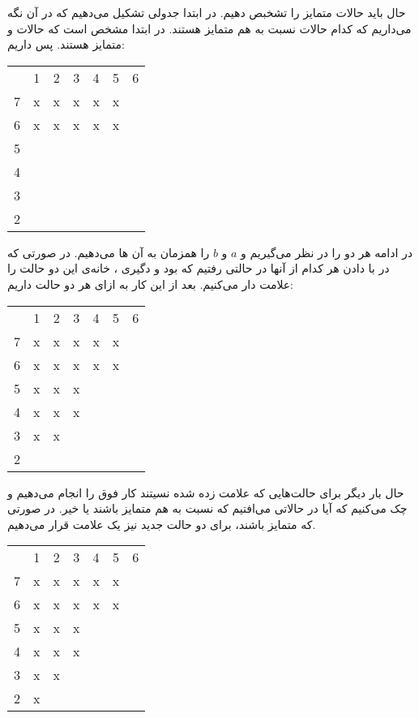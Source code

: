 حال باید حالات متمایز را تشخبص دهیم. در ابتدا جدولی تشکیل می‌دهیم که در آن نگه می‌داریم که
کدام حالات نسبت به هم متمایز هستند. در ابتدا مشخص است که حالات
 و 
متمایز هستند. پس داریم:
\begin{latin}
    \centering
    \begin{tabular}{c|c|c|c|c|c|c|}
          & 1 & 2 & 3 & 4 & 5 & 6\\
        \cline{0-6}
        7 & x & x & x & x & x &  \\
        \cline{0-6}
        6 & x & x & x & x & x\\
        \cline{0-5}
        5 &   &   &   &  \\
        \cline{0-4}
        4 &   &   &  \\
        \cline{0-3}
        3 &   &  \\
        \cline{0-2}
        2 &  \\
        \cline{0-1}
    \end{tabular}
\end{latin}
در ادامه هر دو
را در نظر می‌گیریم و
$a$ و $b$
را همزمان به آن
ها
می‌دهیم. در صورتی که در با دادن هر کدام از آنها در حالتی رفتیم که
بود و دگیری
،
خانه‌ی این دو حالت را علامت دار می‌کنیم. بعد از این کار به ازای
هر دو حالت داریم:
\begin{latin}
    \centering
    \begin{tabular}{c|c|c|c|c|c|c|}
          & 1 & 2 & 3 & 4 & 5 & 6\\
        \cline{0-6}
        7 & x & x & x & x & x &  \\
        \cline{0-6}
        6 & x & x & x & x & x\\
        \cline{0-5}
        5 & x & x & x &  \\
        \cline{0-4}
        4 & x & x & x\\
        \cline{0-3}
        3 & x & x\\
        \cline{0-2}
        2 &  \\
        \cline{0-1}
    \end{tabular}
\end{latin}
حال بار دیگر برای حالت‌هایی که علامت زده شده نسیتند کار فوق
را انجام می‌دهیم و چک می‌کنیم که آیا در حالاتی می‌افتیم که
نسبت به هم متمایز باشند یا خیر. در صورتی که متمایز باشند،
برای دو حالت جدید نیز یک علامت قرار می‌دهیم.
\begin{latin}
    \centering
    \begin{tabular}{c|c|c|c|c|c|c|}
          & 1 & 2 & 3 & 4 & 5 & 6\\
        \cline{0-6}
        7 & x & x & x & x & x &  \\
        \cline{0-6}
        6 & x & x & x & x & x\\
        \cline{0-5}
        5 & x & x & x &  \\
        \cline{0-4}
        4 & x & x & x\\
        \cline{0-3}
        3 & x & x\\
        \cline{0-2}
        2 & x\\
        \cline{0-1}
    \end{tabular}
\end{latin}
